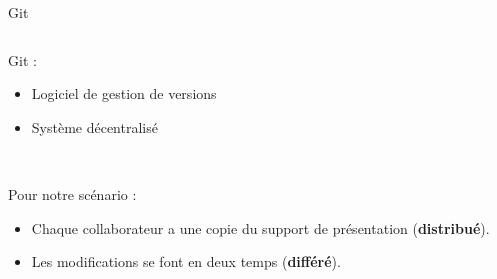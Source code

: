 \begin{frame}{Git}
\begin{columns}
  \begin{column}{.55\textwidth}
  Git :
  \begin{itemize}
    \item Logiciel de gestion de versions
    \item Système décentralisé
  \end{itemize}~

  Pour notre scénario :
  \begin{itemize}
    \item Chaque collaborateur a une copie du support de présentation
    (\textbf{distribué}).
    \item Les modifications se font en deux temps (\textbf{différé}).
  \end{itemize}
  \end{column}


\end{columns}
\end{frame}
